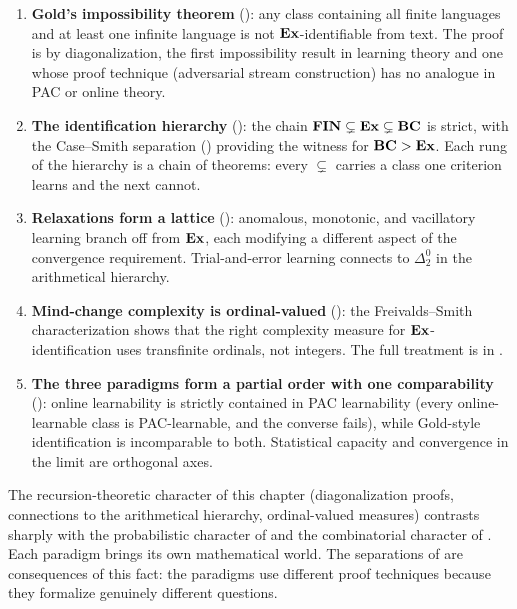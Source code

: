 \begin{enumerate}[leftmargin=*,itemsep=3pt]
\item \textbf{Gold's impossibility theorem} (): any class containing all finite languages and at least one infinite language is not $\mathbf{Ex}$-identifiable from text. The proof is by diagonalization, the first impossibility result in learning theory and one whose proof technique (adversarial stream construction) has no analogue in PAC or online theory.

\item \textbf{The identification hierarchy} (): the chain $\mathbf{FIN} \subsetneq \mathbf{Ex} \subsetneq \mathbf{BC}$ is strict, with the Case--Smith separation () providing the witness for $\mathbf{BC} > \mathbf{Ex}$. Each rung of the hierarchy is a chain of theorems: every $\subsetneq$ carries a class one criterion learns and the next cannot.

\item \textbf{Relaxations form a lattice} (): anomalous, monotonic, and vacillatory learning branch off from $\mathbf{Ex}$, each modifying a different aspect of the convergence requirement. Trial-and-error learning connects to $\Delta^0_2$ in the arithmetical hierarchy.

\item \textbf{Mind-change complexity is ordinal-valued} (): the Freivalds--Smith characterization shows that the right complexity measure for $\mathbf{Ex}$-identification uses transfinite ordinals, not integers. The full treatment is in .

\item \textbf{The three paradigms form a partial order with one comparability} (): online learnability is strictly contained in PAC learnability (every online-learnable class is PAC-learnable, and the converse fails), while Gold-style identification is incomparable to both. Statistical capacity and convergence in the limit are orthogonal axes.
\end{enumerate}

The recursion-theoretic character of this chapter (diagonalization proofs, connections to the arithmetical hierarchy, ordinal-valued measures) contrasts sharply with the probabilistic character of  and the combinatorial character of . Each paradigm brings its own mathematical world. The separations of  are consequences of this fact: the paradigms use different proof techniques because they formalize genuinely different questions.


